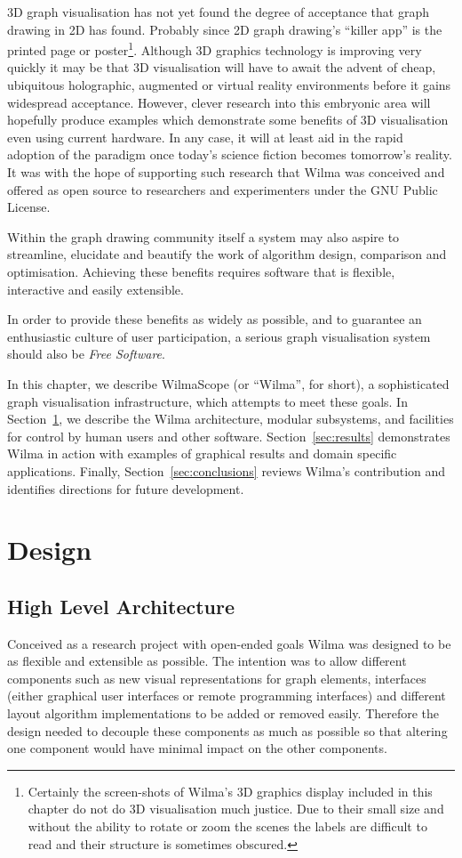\documentclass[runningheads]{cl2emult}
\begin{document}
3D graph visualisation has not yet found the degree of acceptance that
graph drawing in 2D has found.  Probably since 2D graph drawing's
``killer app'' is the printed page or poster\footnote{Certainly the
screen-shots of Wilma's 3D graphics display included in this chapter
do not do 3D visualisation much justice.  Due to their small size and
without the ability to rotate or zoom the scenes the labels are 
difficult to read and their structure is sometimes obscured.}.
Although 3D graphics
technology is improving very quickly it may be that 3D visualisation
will have to await the advent of cheap, ubiquitous holographic,
augmented or virtual reality environments before it gains widespread
acceptance.  However, clever research into this embryonic area will
hopefully produce examples which demonstrate some benefits of 3D
visualisation even using current hardware.  In any case, it will
at least aid in the rapid adoption of the paradigm once today's
science fiction becomes tomorrow's reality.
It was with the hope of supporting such research that Wilma was conceived
and offered as open
source to researchers and experimenters under the GNU Public License.

Within the graph drawing community itself a system may also aspire to 
streamline, elucidate and beautify the work of algorithm design, comparison
and optimisation.  Achieving these benefits requires software that is
flexible, interactive and easily extensible.

In order to provide these benefits as widely as possible, and to guarantee
an enthusiastic culture of user participation, a serious graph visualisation
system should also be {\em Free Software}\cite{stallman92why}.

In this chapter, we describe WilmaScope (or ``Wilma'', for short), a
sophisticated graph visualisation infrastructure, which attempts to meet
these goals.  In Section~\ref{sec:design}, we describe the Wilma
architecture, modular subsystems, and facilities for control by human users
and other software.  Section~\ref{sec:results} demonstrates Wilma in action
with examples of graphical results and domain specific applications.
Finally, Section~\ref{sec:conclusions} reviews Wilma's contribution and
identifies directions for future development.

\section{Design}\label{sec:design}
\subsection{High Level Architecture}
Conceived as a research project with open-ended goals Wilma was
designed to be as flexible and extensible as possible.  The intention
was to allow different components such as new visual representations
for graph elements, interfaces (either graphical user interfaces or
remote programming interfaces) and different 
layout algorithm implementations to be added or removed easily.
Therefore the design needed to decouple these components as much as
possible so that altering one component would have minimal impact on
the other components.
\end{document}
